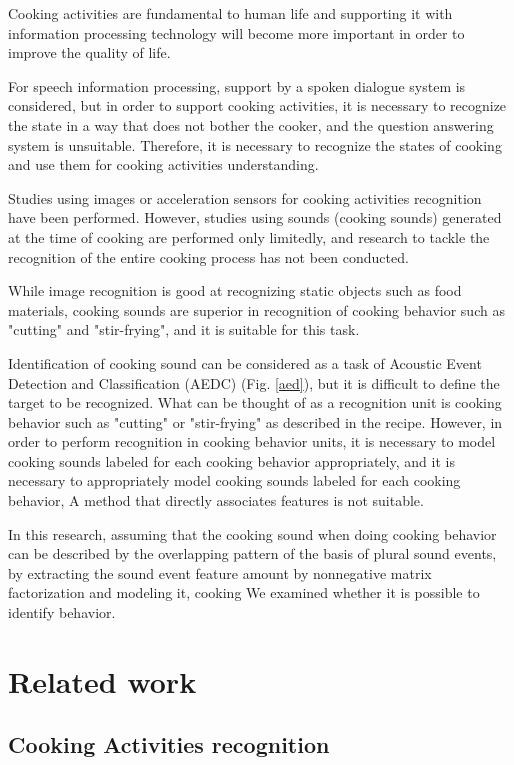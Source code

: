 \documentclass[sigconf]{acmart}
\begin{document}
Cooking activities are fundamental to human life and supporting it with information processing technology will become more important in order to improve the quality of life\cite{Uriu2012}.

For speech information processing, support by a spoken dialogue system is considered, but in order to support cooking activities, it is necessary to recognize the state in a way that does not bother the cooker, and the question answering system is unsuitable. Therefore, it is necessary to recognize the states of cooking and use them for cooking activities understanding.

Studies using images or acceleration sensors for cooking activities recognition have been performed\cite{Torre2008}\cite{Shimada2013}\cite{Kuehne2014}.
However, studies using sounds (cooking sounds) generated at the time of cooking are performed only limitedly\cite{Kojima2016}, and research to tackle the recognition of the entire cooking process has not been conducted.

While image recognition is good at recognizing static objects such as food materials, cooking sounds are superior in recognition of cooking behavior such as "cutting" and "stir-frying", and it is suitable for this task.

Identification of cooking sound can be considered as a task of Acoustic Event Detection and Classification (AEDC) (Fig. \ref{aed}), but it is difficult to define the target to be recognized.
What can be thought of as a recognition unit is cooking behavior such as "cutting" or "stir-frying" as described in the recipe. However, in order to perform recognition in cooking behavior units, it is necessary to model cooking sounds labeled for each cooking behavior appropriately, and it is necessary to appropriately model cooking sounds labeled for each cooking behavior, A method that directly associates features is not suitable\cite{Maijala2018}.

In this research, assuming that the cooking sound when doing cooking behavior can be described by the overlapping pattern of the basis of plural sound events, by extracting the sound event feature amount by nonnegative matrix factorization and modeling it, cooking We examined whether it is possible to identify behavior.

\section{Related work}
\subsection{Cooking Activities recognition}
\end{document}
